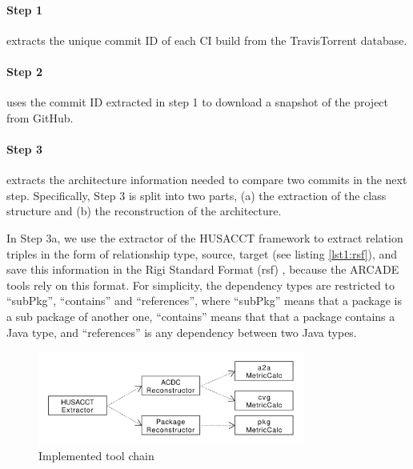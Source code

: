 \documentclass[sigconf, anonymous, review]{acmart}
\newcommand{\sn}[1]{{\color{blue}\textbf{Sarah:}~#1}}
\newcommand{\jk}[1]{{\color{violet}\textbf{Johannes:}~#1}}
\begin{document}
\paragraph{Step 1} extracts the unique commit ID of each CI build from the TravisTorrent database.

\paragraph{Step 2} uses the commit ID extracted in step 1 to download a snapshot of the project from GitHub.


\paragraph{Step 3} extracts the architecture information needed to compare two commits in the next step. 
Specifically, Step 3 is split into two parts, (a) the extraction of the class structure and (b) the reconstruction of the architecture. 

In Step 3a, we use the extractor of the HUSACCT framework \cite{Husacct1} to extract relation triples in the form of relationship type, source, target (see listing \ref{lst1:rsf}), and save this information in the Rigi Standard Format (rsf) \cite{RSF}, because the ARCADE tools rely on this format. 
For simplicity, the dependency types are restricted to ``subPkg'', ``contains'' and ``references'', where ``subPkg'' means that a package is a sub package of another one, ``contains'' means that that a package contains a Java type, and ``references'' is any dependency between two Java types.

\begin{figure}[!t]
	\centering
	\includegraphics[width=3.45in]{assets/implementedArc.pdf}
	\caption{Implemented tool chain}
	\label{implToolchain}
\end{figure}
\end{document}
